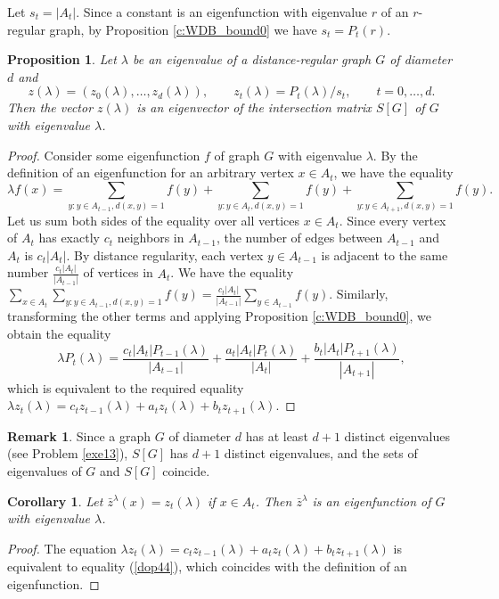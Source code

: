 \documentclass[11pt]{article}
\newtheorem{claim}{Proposition}[section]
\newtheorem{corollary}{Corollary}[section]
\theoremstyle{definition}
\newtheorem{remark}{Remark}[section]
\begin{document}
{{ Let $s_t=|A_t|$. Since a constant
is an eigenfunction with eigenvalue $r$ of an $r$-regular graph, by Proposition \ref{c:WDB_bound0} we have
$s_t=P_t(r)$.

{
\begin{claim}\label{c:polyKrv}
Let $\lambda$ be an eigenvalue of a distance-regular graph
$G$ of diameter $d$ and  $$z(\lambda)=(z_0(\lambda), \dots, z_d(\lambda) ), \qquad z_t(\lambda)=P_t(\lambda)/s_t, \qquad t=0,\dots,d.$$
Then the vector $z(\lambda)$ is an eigenvector of the intersection matrix
 $S[G]$ of $G$ with eigenvalue $\lambda$.
\end{claim}
\begin{proof}
Consider some eigenfunction $f$ of graph $G$ with
eigenvalue $\lambda$. By the definition of an eigenfunction for
an arbitrary vertex $x\in A_t$, we have the equality
\begin{equation}\label{dop44}\lambda f(x)= \sum\limits_{y: y\in
A_{t-1},d(x,y)=1}f(y)+ \sum\limits_{y: y\in
A_{t},d(x,y)=1}f(y)+\sum\limits_{y: y\in
A_{t+1},d(x,y)=1}f(y).\end{equation}
Let us sum both sides
of the equality over all vertices $x\in A_t$. 
Since every vertex of $A_t$ has exactly $c_t$ neighbors in $A_{t-1}$, the number of edges between $A_{t-1}$ and $A_t$ is $c_t|A_t|$.
By  distance regularity, 
 each vertex  $y\in A_{t-1}$ is adjacent to the same number $\frac{c_t|A_t|}{|A_{t-1}|}$ of vertices in $A_t$. We have
the equality $\sum\limits_{x\in A_t}\sum\limits_{y: y\in
A_{t-1},d(x,y)=1}f(y)=\frac{c_t|A_t|}{|A_{t-1}|}\sum\limits_{y\in
A_{t-1}}f(y)$. Similarly, transforming the other terms and
applying Proposition \ref{c:WDB_bound0}, we obtain the equality
$$\lambda P_{t}(\lambda)=\frac{c_t|A_t|P_{t-1}(\lambda)}{|A_{t-1}|}
+\frac{a_t|A_t|P_{t}(\lambda)}{|A_{t}|}+\frac{b_t|A_{t}|P_{t+1}(\lambda)}{|A_{t+1}|},$$
which is equivalent to the required equality $\lambda
z_t(\lambda)=c_tz_{t-1}(\lambda)+a_tz_t(\lambda)+b_tz_{t+1}(\lambda)$.
\end{proof}

\begin{remark}\label{remSG}
Since a graph $G$ of diameter $d$ has at least $d+1$ distinct
eigenvalues (see Problem \ref{exe13}),  $S[G]$ has
$d+1$ distinct eigenvalues, and the sets of eigenvalues
of $G$ and $S[G]$ coincide.
\end{remark}

\begin{corollary}
Let $\bar{z}^\lambda(x)=z_t(\lambda)$ if $x\in A_t$. Then
$\bar{z}^\lambda$
is an eigenfunction of $G$ with eigenvalue $\lambda$.
\end{corollary}
\begin{proof}
The equation $\lambda
z_t(\lambda)=c_tz_{t-1}(\lambda)+a_tz_t(\lambda)+b_tz_{t+1}(\lambda)$
is equivalent to equality (\ref{dop44}), which coincides with
the definition of an eigenfunction.
\end{proof}

}}}
\end{document}
